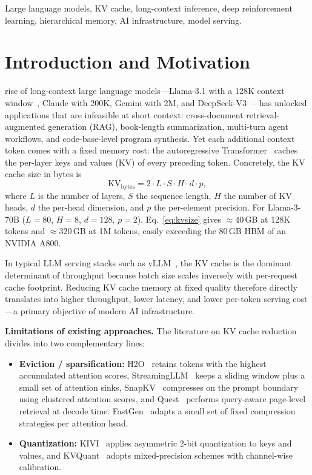 \documentclass[journal]{IEEEtran}
\begin{document}
\begin{IEEEkeywords}
Large language models, KV cache, long-context inference, deep reinforcement learning, hierarchical memory, AI infrastructure, model serving.
\end{IEEEkeywords}

\section{Introduction and Motivation}
 rise of long-context large language models---Llama-3.1 with a 128K context window~\cite{dubey2024llama3}, Claude with 200K, Gemini with 2M, and DeepSeek-V3~\cite{deepseekv3}---has unlocked applications that are infeasible at short context: cross-document retrieval-augmented generation (RAG), book-length summarization, multi-turn agent workflows, and code-base-level program synthesis. Yet each additional context token comes with a fixed memory cost: the autoregressive Transformer~\cite{vaswani2017attention} caches the per-layer keys and values (KV) of every preceding token. Concretely, the KV cache size in bytes is
\begin{equation}
\mathrm{KV}_{\mathrm{bytes}} = 2 \cdot L \cdot S \cdot H \cdot d \cdot p,
\label{eq:kvsize}
\end{equation}
where $L$ is the number of layers, $S$ the sequence length, $H$ the number of KV heads, $d$ the per-head dimension, and $p$ the per-element precision. For Llama-3-70B ($L{=}80$, $H{=}8$, $d{=}128$, $p{=}2$), Eq.~\ref{eq:kvsize} gives $\approx 40$\,GB at 128K tokens and $\approx 320$\,GB at 1M tokens, easily exceeding the 80\,GB HBM of an NVIDIA A800.

In typical LLM serving stacks such as vLLM~\cite{kwon2023vllm}, the KV cache is the dominant determinant of throughput because batch size scales inversely with per-request cache footprint. Reducing KV cache memory at fixed quality therefore directly translates into higher throughput, lower latency, and lower per-token serving cost---a primary objective of modern AI infrastructure.

\textbf{Limitations of existing approaches.} The literature on KV cache reduction divides into two complementary lines:
\begin{itemize}
    \item \textbf{Eviction / sparsification:} H2O~\cite{zhang2023h2o} retains tokens with the highest accumulated attention scores, StreamingLLM~\cite{xiao2024streamingllm} keeps a sliding window plus a small set of attention sinks, SnapKV~\cite{li2024snapkv} compresses on the prompt boundary using clustered attention scores, and Quest~\cite{tang2024quest} performs query-aware page-level retrieval at decode time. FastGen~\cite{ge2024fastgen} adapts a small set of fixed compression strategies per attention head.
    \item \textbf{Quantization:} KIVI~\cite{liu2024kivi} applies asymmetric 2-bit quantization to keys and values, and KVQuant~\cite{hooper2024kvquant} adopts mixed-precision schemes with channel-wise calibration.
\end{itemize}
\end{document}
